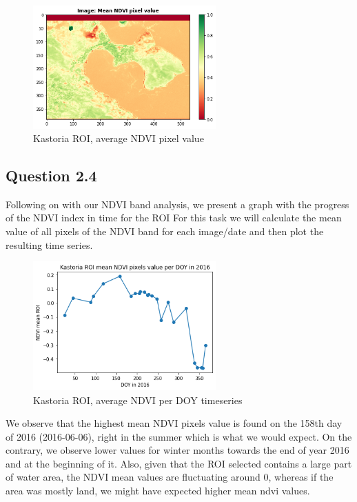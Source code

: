 \begin{figure}[h]
    \centering
    \includegraphics[width=7cm]{figures/q2_3_ROI_clipped_avg_ndvi_pixels.png}
    \caption{Kastoria ROI, average NDVI pixel value}
    \label{fig:Kastoria ROI, average NDVI pixel value}
\end{figure}
\FloatBarrier %

\subsection{Question 2.4}
Following on with our NDVI band analysis, we present a graph with the progress of the NDVI index in time for the ROI For this task we will calculate the mean value of all pixels of the NDVI band for each image/date and then plot the resulting time series.

\begin{figure}[h]
    \centering
    \includegraphics[width=7cm]{figures/q2_4_ROI_clipped_mean_ndvi_timeseries.png}
    \caption{Kastoria ROI, average NDVI per DOY timeseries}
    \label{fig:Kastoria ROI, average NDVI per DOY timeseries}
\end{figure}
\FloatBarrier %

We observe that the highest mean NDVI pixels value is found on the 158th day of 2016 (2016-06-06), right in the summer which is what we would expect. On the contrary, we observe lower values for winter months towards the end of year 2016 and at the beginning of it. Also, given that the ROI selected contains a large part of water area, the NDVI mean values are fluctuating around 0, whereas if the area was mostly land, we might have expected higher mean ndvi values.

